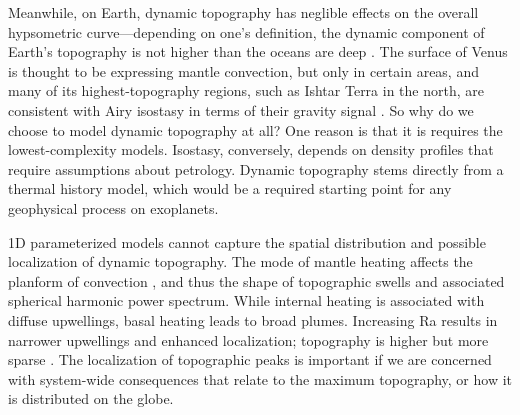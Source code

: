 Meanwhile, on Earth, dynamic topography has neglible effects on the overall hypsometric curve---depending on one's definition, the dynamic component of Earth's topography is not higher than the oceans are deep \citep{Molnar2015, Hoggard2016}. The surface of Venus is thought to be expressing mantle convection, but only in certain areas, and many of its highest-topography regions, such as Ishtar Terra in the north, are consistent with Airy isostasy in terms of their gravity signal \citep{Grimm1991, Yang2016}. So why do we choose to model dynamic topography at all? One reason is that it is requires the lowest-complexity models. Isostasy, conversely, depends on density profiles that require assumptions about petrology. Dynamic topography stems directly from a thermal history model, which would be a required starting point for any geophysical process on exoplanets.

1D parameterized models cannot capture the spatial distribution and possible localization of dynamic topography. The mode of mantle heating affects the planform of convection \citep[e.g.,][]{Choblet2009}, and thus the shape of topographic swells and associated spherical harmonic power spectrum. While internal heating is associated with diffuse upwellings, basal heating leads to broad plumes. Increasing Ra results in narrower upwellings and enhanced localization; topography is higher but more sparse \citep{Bunge1996}. The localization of topographic peaks is important if we are concerned with system-wide consequences that relate to the maximum topography, or how it is distributed on the globe.



